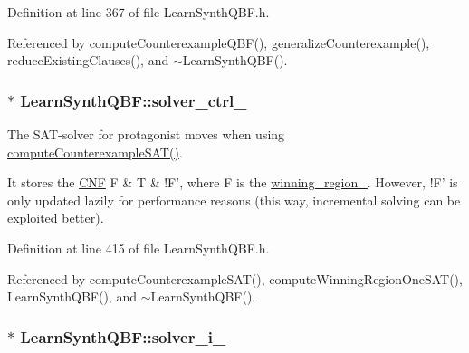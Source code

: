 Definition at line 367 of file Learn\-Synth\-Q\-B\-F.\-h.



Referenced by compute\-Counterexample\-Q\-B\-F(), generalize\-Counterexample(), reduce\-Existing\-Clauses(), and $\sim$\-Learn\-Synth\-Q\-B\-F().

\hypertarget{classLearnSynthQBF_a14f20d46129ad1fe2db8272348a7e589}{
\subsubsection[{solver\-\_\-ctrl\-\_\-}]{$\ast$ Learn\-Synth\-Q\-B\-F\-::solver\-\_\-ctrl\-\_\-\hspace{0.3cm}{\ttfamily [protected]}}}\label{classLearnSynthQBF_a14f20d46129ad1fe2db8272348a7e589}


The S\-A\-T-\/solver for protagonist moves when using \hyperlink{classLearnSynthQBF_a3221800bf3f040b66b8a790bab4c82b5}{compute\-Counterexample\-S\-A\-T()}. 

It stores the \hyperlink{classCNF}{C\-N\-F} F \& T \& !\-F', where F is the \hyperlink{classLearnSynthQBF_a9c6b41f7df5f4ed4bfc5930136fc1152}{winning\-\_\-region\-\_\-}. However, !\-F' is only updated lazily for performance reasons (this way, incremental solving can be exploited better). 

Definition at line 415 of file Learn\-Synth\-Q\-B\-F.\-h.



Referenced by compute\-Counterexample\-S\-A\-T(), compute\-Winning\-Region\-One\-S\-A\-T(), Learn\-Synth\-Q\-B\-F(), and $\sim$\-Learn\-Synth\-Q\-B\-F().

\hypertarget{classLearnSynthQBF_ada2e8c87c0ca0d83c484d6181ea5a788}{
\subsubsection[{solver\-\_\-i\-\_\-}]{$\ast$ Learn\-Synth\-Q\-B\-F\-::solver\-\_\-i\-\_\-\hspace{0.3cm}{\ttfamily [protected]}}}\label{classLearnSynthQBF_ada2e8c87c0ca0d83c484d6181ea5a788}


